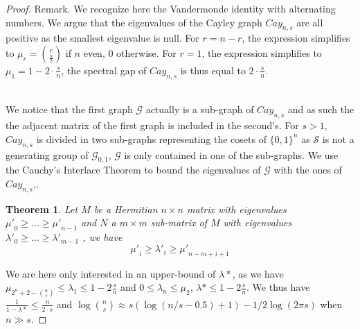 \documentclass[USenglish,oneside,twocolumn]{article}
\newtheorem{theorem}{Theorem}
\begin{document}
\begin{proof}
Remark. We recognize here the Vandermonde identity with alternating numbers. We argue that the eigenvalues of the Cayley graph $Cay_{n,s}$ are all positive as the smallest eigenvalue is null.
For $r=n-r$, the expression simplifies to $\mu_r = {r \choose \frac{n}{2}}$ if $n$ even, 0 otherwise.
For $r=1$, the expression simplifies to $\mu_1 = 1 - 2\cdot \frac{s}{n}$, the spectral gap of $Cay_{n,s}$ is thus equal to $2\cdot \frac{s}{n}$.\\\

We notice that the first graph $\mathcal{G}$ actually is a sub-graph of $Cay_{n,s}$ and as such the the adjacent matrix of the first graph is included in the second's.
For $s>1$, $Cay_{n,s}$ is divided in two sub-graphs representing the cosets of $\{0,1\}^n$ as $\mathcal{S}$ is not a generating group of $\mathcal{G}_{0,1}$, $\mathcal{G}$ is only contained in one of the sub-graphs.
We use the Cauchy's Interlace Theorem to bound the eigenvalues of $\mathcal{G}$ with the ones of $Cay_{n,s}$,.

\begin{theorem}
Let $M$ be a Hermitian $n \times n$ matrix with eigenvalues ${\mu'}_0\geq ... \geq {\mu'}_{n-1}$ and $N$ a $m \times m$ sub-matrix of $M$ with eigenvalues ${\lambda'}_0\geq ... \geq {\lambda'}_{m-1}$ , we have
$$ {\mu'}_i \geq {\lambda'}_i \geq {\mu'}_{n-m+i+1} $$
\end{theorem}

We are here only interested in an upper-bound of $\lambda*$, as we have $\mu_{2^n+2-{n \choose s}}\leq \lambda_1\leq 1-2\frac{s}{n}$ and $0 \leq \lambda_n \leq \mu_2$, $\lambda* \leq 1-2\frac{s}{n}$. We thus have $\frac{1}{1-\lambda*}\leq\frac{n}{2\cdot s}$ and $\log {n \choose s} \approx s(\log(n/s-0.5)+1) -1/2\log(2\pi s)$ when $n \gg s$.
\end{proof}
\end{document}

